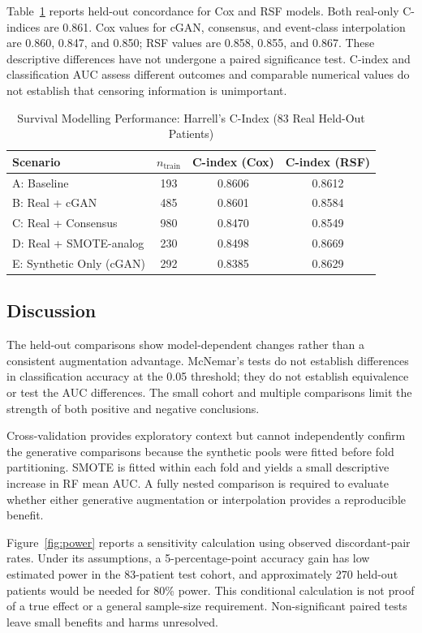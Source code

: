 \documentclass[journal]{IEEEtran}
\begin{document}
Table~\ref{tab:survival} reports held-out concordance for Cox and RSF models. Both real-only C-indices are 0.861. Cox values for cGAN, consensus, and event-class interpolation are 0.860, 0.847, and 0.850; RSF values are 0.858, 0.855, and 0.867. These descriptive differences have not undergone a paired significance test. C-index and classification AUC assess different outcomes and comparable numerical values do not establish that censoring information is unimportant.

\begin{table}[!tb]
  \centering
  \caption{Survival Modelling Performance: Harrell's C-Index (83 Real Held-Out Patients)}
  \label{tab:survival}
  \begin{tabular}{lccc}
    \toprule
    Scenario & $n_{\text{train}}$ & C-index (Cox) & C-index (RSF) \\
    \midrule
    A: Baseline          & 193 & 0.8606 & 0.8612 \\
    B: Real + cGAN      & 485 & 0.8601 & 0.8584 \\
    C: Real + Consensus  & 980 & 0.8470 & 0.8549 \\
    D: Real + SMOTE-analog & 230 & 0.8498 & 0.8669 \\
    E: Synthetic Only (cGAN) & 292 & 0.8385 & 0.8629 \\
    \bottomrule
  \end{tabular}
\end{table}

\subsection{Discussion}

The held-out comparisons show model-dependent changes rather than a consistent augmentation advantage. McNemar's tests do not establish differences in classification accuracy at the 0.05 threshold; they do not establish equivalence or test the AUC differences. The small cohort and multiple comparisons limit the strength of both positive and negative conclusions.

Cross-validation provides exploratory context but cannot independently confirm the generative comparisons because the synthetic pools were fitted before fold partitioning. SMOTE is fitted within each fold and yields a small descriptive increase in RF mean AUC. A fully nested comparison is required to evaluate whether either generative augmentation or interpolation provides a reproducible benefit.

\label{sec:power}
Figure~\ref{fig:power} reports a sensitivity calculation using observed discordant-pair rates. Under its assumptions, a 5-percentage-point accuracy gain has low estimated power in the 83-patient test cohort, and approximately 270 held-out patients would be needed for 80\% power. This conditional calculation is not proof of a true effect or a general sample-size requirement. Non-significant paired tests leave small benefits and harms unresolved.
\end{document}

